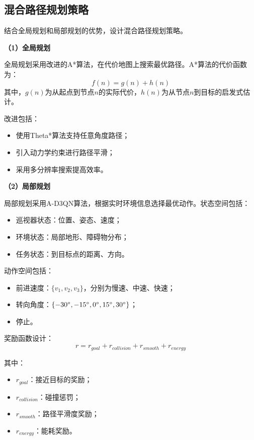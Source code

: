 \subsection{混合路径规划策略}
\label{subsec:hybrid_planning}

结合全局规划和局部规划的优势，设计混合路径规划策略。

\textbf{（1）全局规划}

全局规划采用改进的A*算法，在代价地图上搜索最优路径。A*算法的代价函数为：
\begin{equation}
    f(n) = g(n) + h(n)
    \label{eq:astar}
\end{equation}
其中，$g(n)$为从起点到节点$n$的实际代价，$h(n)$为从节点$n$到目标的启发式估计。

改进包括：
\begin{itemize}
    \item 使用Theta*算法支持任意角度路径；
    \item 引入动力学约束进行路径平滑；
    \item 采用多分辨率搜索提高效率。
\end{itemize}

\textbf{（2）局部规划}

局部规划采用A-D3QN算法，根据实时环境信息选择最优动作。状态空间包括：
\begin{itemize}
    \item 巡视器状态：位置、姿态、速度；
    \item 环境状态：局部地形、障碍物分布；
    \item 任务状态：到目标点的距离、方向。
\end{itemize}

动作空间包括：
\begin{itemize}
    \item 前进速度：$\{v_1, v_2, v_3\}$，分别为慢速、中速、快速；
    \item 转向角度：$\{-30\degree, -15\degree, 0\degree, 15\degree, 30\degree\}$；
    \item 停止。
\end{itemize}

奖励函数设计：
\begin{equation}
    r = r_{goal} + r_{collision} + r_{smooth} + r_{energy}
    \label{eq:reward}
\end{equation}

其中：
\begin{itemize}
    \item $r_{goal}$：接近目标的奖励；
    \item $r_{collision}$：碰撞惩罚；
    \item $r_{smooth}$：路径平滑度奖励；
    \item $r_{energy}$：能耗奖励。
\end{itemize}

